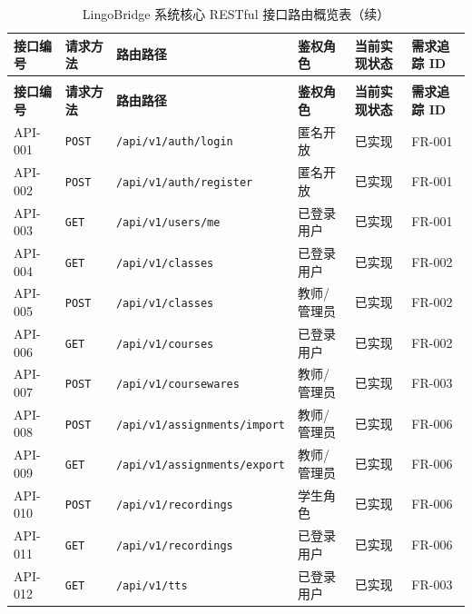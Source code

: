 \begingroup
\footnotesize
\setlength{\tabcolsep}{3pt}
\renewcommand{\arraystretch}{1.18}
\begin{longtable}{@{}p{1.35cm} p{1.05cm} p{4.1cm} p{2.0cm} p{1.8cm} p{1.45cm}@{}}
\caption{LingoBridge 系统核心 RESTful 接口路由概览表} \label{tab:api_overview} \\
\toprule
\textbf{接口编号} & \textbf{请求方法} & \textbf{路由路径} & \textbf{鉴权角色} & \textbf{当前实现状态} & \textbf{需求追踪 ID} \\
\midrule
\endfirsthead
\caption[]{LingoBridge 系统核心 RESTful 接口路由概览表（续）} \\
\toprule
\textbf{接口编号} & \textbf{请求方法} & \textbf{路由路径} & \textbf{鉴权角色} & \textbf{当前实现状态} & \textbf{需求追踪 ID} \\
\midrule
\endhead
\bottomrule
\endfoot
API-001 & \texttt{POST} & \texttt{/api/\allowbreak v1/\allowbreak auth/\allowbreak login} & 匿名开放 & 已实现 & FR-001 \\
API-002 & \texttt{POST} & \texttt{/api/\allowbreak v1/\allowbreak auth/\allowbreak register} & 匿名开放 & 已实现 & FR-001 \\
API-003 & \texttt{GET} & \texttt{/api/\allowbreak v1/\allowbreak users/\allowbreak me} & 已登录用户 & 已实现 & FR-001 \\
API-004 & \texttt{GET} & \texttt{/api/\allowbreak v1/\allowbreak classes} & 已登录用户 & 已实现 & FR-002 \\
API-005 & \texttt{POST} & \texttt{/api/\allowbreak v1/\allowbreak classes} & 教师/管理员 & 已实现 & FR-002 \\
API-006 & \texttt{GET} & \texttt{/api/\allowbreak v1/\allowbreak courses} & 已登录用户 & 已实现 & FR-002 \\
API-007 & \texttt{POST} & \texttt{/api/\allowbreak v1/\allowbreak coursewares} & 教师/管理员 & 已实现 & FR-003 \\
API-008 & \texttt{POST} & \texttt{/api/\allowbreak v1/\allowbreak assignments/\allowbreak import} & 教师/管理员 & 已实现 & FR-006 \\
API-009 & \texttt{GET} & \texttt{/api/\allowbreak v1/\allowbreak assignments/\allowbreak export} & 教师/管理员 & 已实现 & FR-006 \\
API-010 & \texttt{POST} & \texttt{/api/\allowbreak v1/\allowbreak recordings} & 学生角色 & 已实现 & FR-006 \\
API-011 & \texttt{GET} & \texttt{/api/\allowbreak v1/\allowbreak recordings} & 已登录用户 & 已实现 & FR-006 \\
API-012 & \texttt{GET} & \texttt{/api/\allowbreak v1/\allowbreak tts} & 已登录用户 & 已实现 & FR-003 \\

\end{longtable}
